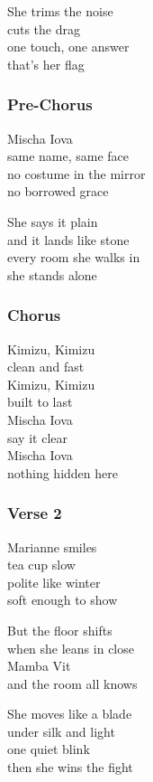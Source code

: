 She trims the noise\\
cuts the drag\\
one touch, one answer\\
that's her flag

\subsubsection{Pre-Chorus}\label{pre-chorus-4}

Mischa Iova\\
same name, same face\\
no costume in the mirror\\
no borrowed grace

She says it plain\\
and it lands like stone\\
every room she walks in\\
she stands alone

\subsubsection{Chorus}\label{chorus-12}

Kimizu, Kimizu\\
clean and fast\\
Kimizu, Kimizu\\
built to last\\
Mischa Iova\\
say it clear\\
Mischa Iova\\
nothing hidden here

\subsubsection{Verse 2}\label{verse-2-3}

Marianne smiles\\
tea cup slow\\
polite like winter\\
soft enough to show

But the floor shifts\\
when she leans in close\\
Mamba Vit\\
and the room all knows

She moves like a blade\\
under silk and light\\
one quiet blink\\
then she wins the fight

